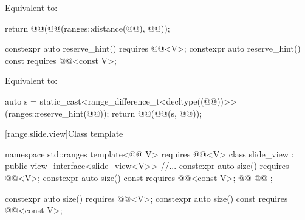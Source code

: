 \documentclass{wg21}
\begin{document}
\begin{itemdescr}
    \pnum
    \effects
    Equivalent to:
    \begin{codeblock}
        return @@(@@(ranges::distance(@@), @@));
    \end{codeblock}
\end{itemdescr}

\begin{addedblock}
\begin{itemdecl}
    constexpr auto reserve_hint() requires @@<V>;
    constexpr auto reserve_hint() const requires @@<const V>;
\end{itemdecl}

\begin{itemdescr}
    \pnum
    \effects
    Equivalent to:
    \begin{codeblock}
    	auto s = static_cast<range_difference_t<decltype((@@))>>(ranges::reserve_hint(@@));
    	return @@(@@(s, @@));
    \end{codeblock}
\end{itemdescr}
\end{addedblock}

[range.slide.view]{Class template }

%
%
%
\begin{codeblock}
namespace std::ranges {
template<@@ V>
requires @@<V>
class slide_view : public view_interface<slide_view<V>> {
    //...
    constexpr auto size() requires @@<V>;
    constexpr auto size() const requires @@<const V>;
    @@
    @@
};
}
\end{codeblock}

\begin{itemdecl}
    constexpr auto size() requires @@<V>;
    constexpr auto size() const requires @@<const V>;
\end{itemdecl}
\end{document}
